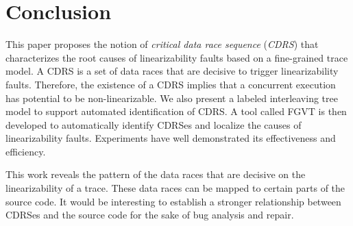 \documentclass[runningheads]{llncs}
\begin{document}

\section{Conclusion}\label{sec:conclusion}
This paper proposes the notion of \textit{critical data race sequence} (\textit{CDRS}) that characterizes the root causes of linearizability faults based on a fine-grained trace model. A CDRS is a set of data races that are decisive to trigger linearizability faults. Therefore, the existence of a CDRS implies that a concurrent execution has potential to be non-linearizable. We also present a labeled interleaving tree model to support automated identification of CDRS. A tool called FGVT is then developed to automatically identify CDRSes and localize the causes of linearizability faults. Experiments have well demonstrated its effectiveness and efficiency.

This work reveals the pattern of the data races that are decisive on the linearizability of a trace. These data races can be mapped to certain parts of the source code. It would be interesting to establish a stronger relationship between CDRSes and the source code for the sake of bug analysis and repair.

%
%
 
 
%
\end{document}

